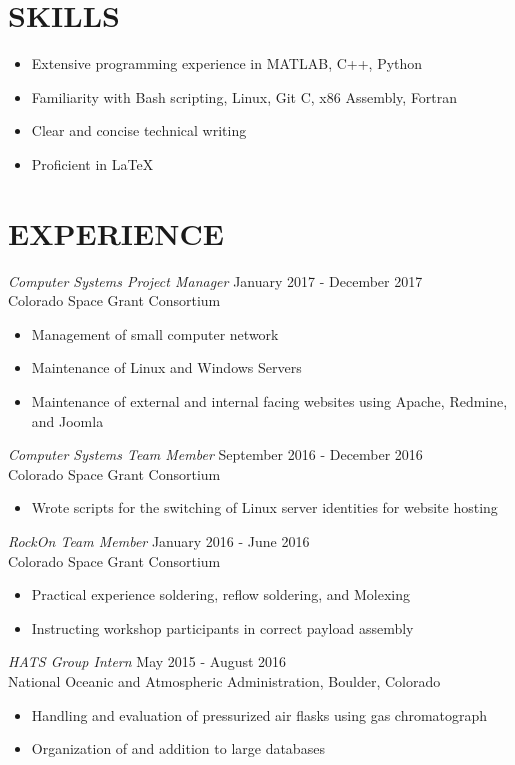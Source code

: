 \documentclass[margin, 10pt]{res} %
\begin{document}
\begin{resume}
\section{SKILLS} 
\begin{itemize} \itemsep -2pt %
\item Extensive programming experience in MATLAB, C++, Python
\item Familiarity with Bash scripting, Linux, Git C, x86 Assembly, Fortran
\item Clear and concise technical writing
\item Proficient in LaTeX
\end{itemize}

\section{EXPERIENCE}

{\sl Computer Systems Project Manager} \hfill January 2017 - December 2017 \\
Colorado Space Grant Consortium
\begin{itemize}\itemsep -2pt
\item Management of small computer network
\item Maintenance of Linux and Windows Servers
\item Maintenance of external and internal facing websites using Apache, Redmine, and Joomla
\end{itemize} 

{\sl Computer Systems Team Member} \hfill September 2016 - December 2016 \\
Colorado Space Grant Consortium
\begin{itemize} \itemsep -2pt %
\item Wrote scripts for the switching of Linux server identities for website hosting
\end{itemize}
 
 {\sl RockOn Team Member} \hfill
 January 2016 - June 2016 \\
 Colorado Space Grant Consortium
 \begin{itemize} \itemsep -2pt %
 	\item Practical experience soldering, reflow soldering, and Molexing
    \item Instructing workshop participants in correct payload assembly
 \end{itemize}
 
{\sl HATS Group Intern} \hfill May 2015 - August 2016\\
National Oceanic and Atmospheric Administration, Boulder, Colorado
\begin{itemize}  \itemsep -2pt %
\item Handling and evaluation of pressurized air flasks using gas chromatograph
\item Organization of and addition to large databases
\end{itemize} 
\end{resume}
\end{document}
